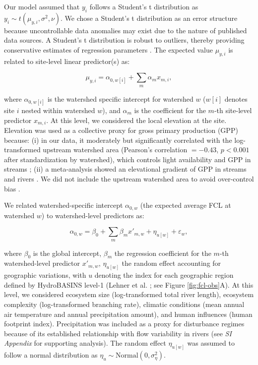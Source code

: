 \documentclass[11pt, class=article, crop=false]{standalone}
\begin{document}
Our model assumed that $y_i$ follows a Student's t distribution as $y_i \sim t(\mu_{y,i}, \sigma^2, \nu)$.
We chose a Student's t distribution as an error structure because uncontrollable data anomalies may exist due to the nature of published data sources.
A Student's t distribution is robust to outliers, thereby providing conservative estimates of regression parameters \citep{lunn_bugs_2012}.
The expected value $\mu_{y,i}$ is related to site-level linear predictor(s) as:

\begin{equation}
    \mu_{y,i} = \alpha_{0, w[i]} + \sum_m \alpha_m x_{m,i},
\end{equation}

where $\alpha_{0, w[i]}$ is the watershed specific intercept for watershed $w$ ($w[i]$ denotes site $i$ nested within watershed $w$), and $\alpha_m$ is the coefficient for the $m$-th site-level predictor $x_{m, i}$.
At this level, we considered the local elevation at the site. 
Elevation was used as a collective proxy for gross primary production (GPP) because: (i) in our data, it moderately but significantly correlated with the log-transformed upstream watershed area (Pearson's correlation $= -0.43$, $p < 0.001$ after standardization by watershed), which controls light availability and GPP in streams \citep{finlay_light-mediated_2011, finlay_stream_2011, bernhardt_light_2022}; (ii) a meta-analysis showed an elevational gradient of GPP in streams and rivers \citep{marzolf_ecosystem_2021}.
We did not include the upstream watershed area to avoid over-control bias \citep{arif_predictive_2022}.

We related watershed-specific intercept $\alpha_{0, w}$ (the expected average FCL at watershed $w$) to watershed-level predictors as:

\begin{equation}
    \alpha_{0, w} = \beta_0 + \sum_m \beta_m x'_{m, w} + \eta_{u[w]} + \varepsilon_{w},
    \label{eq:watershed-avarage}
\end{equation}

where $\beta_0$ is the global intercept, $\beta_m$ the regression coefficient for the $m$-th watershed-level predictor $x'_{m, w}$, $\eta_{u[w]}$ the random effect accounting for geographic variations, with $u$ denoting the index for each geographic region defined by HydroBASINS level-1 (Lehner et al. \citep{lehner_global_2013}; see Figure \ref{fig:fcl-obs}A).
At this level, we considered ecosystem size (log-transformed total river length), ecosystem complexity (log-transformed branching rate), climatic conditions (mean annual air temperature and annual precipitation amount), and human influences (human footprint index).
Precipitation was included as a proxy for disturbance regimes because of its established relationship with flow variability in rivers (see \textit{SI Appendix} for supporting analysis).
The random effect $\eta_{u[w]}$ was assumed to follow a normal distribution as $\eta_{u} \sim \mbox{Normal}(0, \sigma_{\eta}^2)$.
\end{document}
